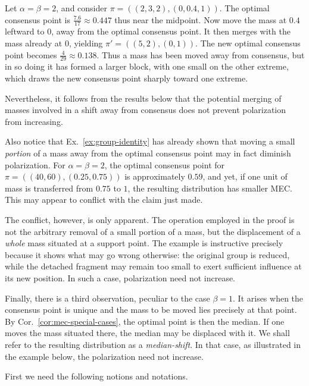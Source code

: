 \begin{example}
Let \(\alpha=\beta=2\), and consider \(\pi=((2,3,2),(0,0.4,1))\). The optimal consensus point is \( \frac{7.6}{17}\approx 0.447\) thus near the midpoint. Now move the mass at \(0.4\) leftward to \(0\), away from the optimal consensus point. It then merges with the mass already at \(0\), yielding \(\pi'=((5,2),(0,1))\). The new optimal consensus point becomes \(\frac{4}{29}\approx 0.138\). Thus a mass has been moved away from consensus, but in so doing it has formed a larger block, with one small on the other extreme, which draws the new consensus point sharply toward one extreme.
\end{example}

Nevertheless, it follows from the results below that the potential merging of masses involved in a shift away from consensus does not prevent polarization from increasing.

Also notice that Ex.~\ref{ex:group-identity} has already shown that moving a small \emph{portion} of a mass away from the optimal consensus point may in fact diminish polarization. For \(\alpha=\beta=2\), the optimal consensus point for \(\pi=((40,60),(0.25,0.75))\) is approximately \(0.59\), and yet, if one unit of mass is transferred from \(0.75\) to \(1\), the resulting distribution has smaller MEC. This may appear to conflict with the claim just made.

The conflict, however, is only apparent. The operation employed in the proof is not the arbitrary removal of a small portion of a mass, but the displacement of a \emph{whole} mass situated at a support point. The example is instructive precisely because it shows what may go wrong otherwise: the original group is reduced, while the detached fragment may remain too small to exert sufficient influence at its new position. In such a case, polarization need not increase.

Finally, there is a third observation, peculiar to the case \(\beta=1\). It arises when the consensus point is unique and the mass to be moved lies precisely at that point. By Cor.~\ref{cor:mec-special-cases}, the optimal point is then the median. If one moves the mass situated there, the median may be displaced with it. We shall refer to the resulting distribution as a \emph{median-shift}. In that case, as illustrated in the example below, the polarization need not increase.

First we need the following notions and notations.  

